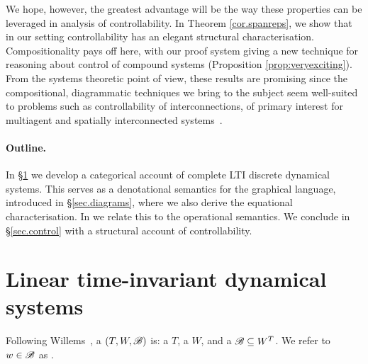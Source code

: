 We hope, however, the greatest advantage will be the way these properties can be
leveraged in analysis of controllability. In Theorem \ref{cor.spanreps}, we
show that in our setting controllability has an elegant structural
characterisation.  Compositionality pays off here, with our proof system giving
a new technique for reasoning about control of compound systems (Proposition
\ref{prop:veryexciting}).  From the systems theoretic point of view, these
results are promising since the compositional, diagrammatic techniques we bring
to the subject seem well-suited to problems such as controllability of
interconnections, of primary interest for multiagent and spatially
interconnected systems~\cite{OFM}.
%

\paragraph{Outline.}
In \S\ref{sec.systems} we develop a categorical account of complete LTI discrete
dynamical systems. This serves as a denotational semantics for the graphical
language, introduced in \S\ref{sec.diagrams}, where we also derive the
equational characterisation. 
In we relate this to the operational semantics. We conclude  
in \S\ref{sec.control} with a structural account of controllability.





\section{Linear time-invariant dynamical systems} \label{sec.systems}

Following Willems~\cite{Wi3}, a  $(T, W,{\mathscr B})$ is: a
 $T$, a  $W$, and a 
${\mathscr B} \subseteq W^T$. We refer to $w \in {\mathscr B}$ as . 

